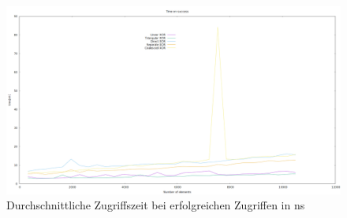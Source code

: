 \begin{figure}[!ht]
    \includegraphics[width=0.7\paperwidth]{Bilder/successful_time_part.png}
    \caption{Durchschnittliche Zugriffszeit bei erfolgreichen Zugriffen in ns}
\end{figure}
\FloatBarrier